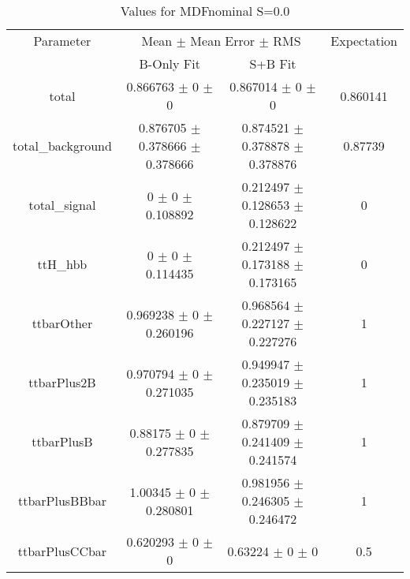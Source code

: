 \begin{table}
\centering
\caption{Values for MDFnominal S=0.0}
\begin{tabular}{cccc}
\toprule
Parameter & \multicolumn{2}{c}{Mean $\pm$ Mean Error $\pm$ RMS} & Expectation\\
 & B-Only Fit & S+B Fit & \\
\midrule
total & \num{0.866763} $\pm$ \num{0} $\pm$ \num{0} & \num{0.867014} $\pm$ \num{0} $\pm$ \num{0} & \num{0.860141}\\
total\_background & \num{0.876705} $\pm$ \num{0.378666} $\pm$ \num{0.378666} & \num{0.874521} $\pm$ \num{0.378878} $\pm$ \num{0.378876} & \num{0.87739}\\
total\_signal & \num{0} $\pm$ \num{0} $\pm$ \num{0.108892} & \num{0.212497} $\pm$ \num{0.128653} $\pm$ \num{0.128622} & \num{0}\\
ttH\_hbb & \num{0} $\pm$ \num{0} $\pm$ \num{0.114435} & \num{0.212497} $\pm$ \num{0.173188} $\pm$ \num{0.173165} & \num{0}\\
ttbarOther & \num{0.969238} $\pm$ \num{0} $\pm$ \num{0.260196} & \num{0.968564} $\pm$ \num{0.227127} $\pm$ \num{0.227276} & \num{1}\\
ttbarPlus2B & \num{0.970794} $\pm$ \num{0} $\pm$ \num{0.271035} & \num{0.949947} $\pm$ \num{0.235019} $\pm$ \num{0.235183} & \num{1}\\
ttbarPlusB & \num{0.88175} $\pm$ \num{0} $\pm$ \num{0.277835} & \num{0.879709} $\pm$ \num{0.241409} $\pm$ \num{0.241574} & \num{1}\\
ttbarPlusBBbar & \num{1.00345} $\pm$ \num{0} $\pm$ \num{0.280801} & \num{0.981956} $\pm$ \num{0.246305} $\pm$ \num{0.246472} & \num{1}\\
ttbarPlusCCbar & \num{0.620293} $\pm$ \num{0} $\pm$ \num{0} & \num{0.63224} $\pm$ \num{0} $\pm$ \num{0} & \num{0.5}\\
\bottomrule
\end{tabular}
\end{table}
